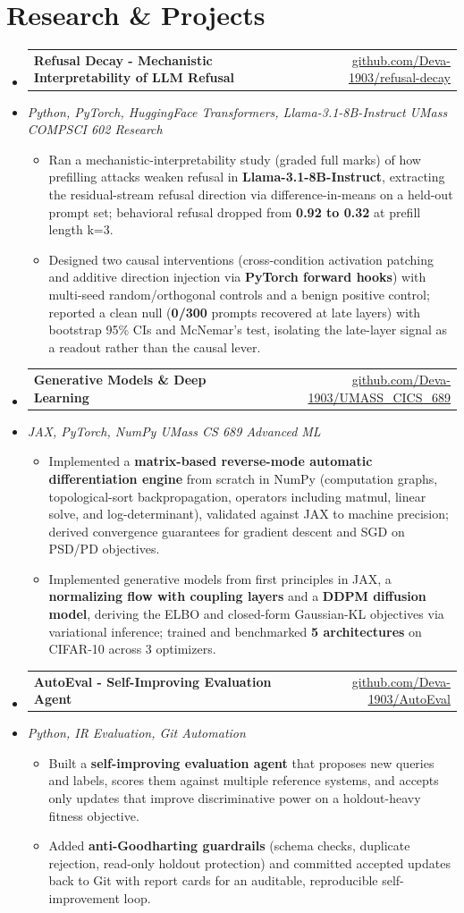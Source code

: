 \documentclass[letterpaper,10pt]{article}
\makeatletter
\newcommand{\resumeItem}[1]{
  \item\small{#1\vspace{-1pt}}
}
\newcommand{\resumeProjectHeading}[2]{
    \item
    \begin{tabular*}{0.985\textwidth}[t]{l@{\extracolsep{\fill}}r}
      \small\textbf{#1} & \small #2 \\
    \end{tabular*}\vspace{-5pt}
}
\newcommand{\resumeProjectSubheading}[1]{
  \vspace{-2pt}\item[] {\small\textcolor{ResumeSlate}{\emph{#1}}}\vspace{-3pt}
}
\newcommand{\resumeSubHeadingListStart}{\begin{itemize}[leftmargin=0.0in, label={}, itemsep=2pt, topsep=2pt]}
\newcommand{\resumeSubHeadingListEnd}{\end{itemize}}
\newcommand{\resumeItemListStart}{\begin{itemize}[leftmargin=0.18in, itemsep=2pt, topsep=1pt]}
\newcommand{\resumeItemListEnd}{\end{itemize}\vspace{-4pt}}
\makeatother
\begin{document}
\section{Research \& Projects}
\resumeSubHeadingListStart
  \resumeProjectHeading
    {Refusal Decay - Mechanistic Interpretability of LLM Refusal}
    {\href{https://github.com/Deva-1903/refusal-decay}{github.com/Deva-1903/refusal-decay}}
  \resumeProjectSubheading{Python, PyTorch, HuggingFace Transformers, Llama-3.1-8B-Instruct \enspace\textbar\enspace UMass COMPSCI 602 Research}
    \resumeItemListStart
      \resumeItem{Ran a mechanistic-interpretability study (graded full marks) of how prefilling attacks weaken refusal in \textbf{Llama-3.1-8B-Instruct}, extracting the residual-stream refusal direction via difference-in-means on a held-out prompt set; behavioral refusal dropped from \textbf{0.92 to 0.32} at prefill length k=3.}
      \resumeItem{Designed two causal interventions (cross-condition activation patching and additive direction injection via \textbf{PyTorch forward hooks}) with multi-seed random/orthogonal controls and a benign positive control; reported a clean null (\textbf{0/300} prompts recovered at late layers) with bootstrap 95\% CIs and McNemar's test, isolating the late-layer signal as a readout rather than the causal lever.}
    \resumeItemListEnd
  \resumeProjectHeading
    {Generative Models \& Deep Learning}
    {\href{https://github.com/Deva-1903/UMASS_CICS_689}{github.com/Deva-1903/UMASS\_CICS\_689}}
  \resumeProjectSubheading{JAX, PyTorch, NumPy \enspace\textbar\enspace UMass CS 689 Advanced ML}
    \resumeItemListStart
      \resumeItem{Implemented a \textbf{matrix-based reverse-mode automatic differentiation engine} from scratch in NumPy (computation graphs, topological-sort backpropagation, operators including matmul, linear solve, and log-determinant), validated against JAX to machine precision; derived convergence guarantees for gradient descent and SGD on PSD/PD objectives.}
      \resumeItem{Implemented generative models from first principles in JAX, a \textbf{normalizing flow with coupling layers} and a \textbf{DDPM diffusion model}, deriving the ELBO and closed-form Gaussian-KL objectives via variational inference; trained and benchmarked \textbf{5 architectures} on CIFAR-10 across 3 optimizers.}
    \resumeItemListEnd
  \resumeProjectHeading
    {AutoEval - Self-Improving Evaluation Agent}
    {\href{https://github.com/Deva-1903/AutoEval}{github.com/Deva-1903/AutoEval}}
  \resumeProjectSubheading{Python, IR Evaluation, Git Automation}
    \resumeItemListStart
      \resumeItem{Built a \textbf{self-improving evaluation agent} that proposes new queries and labels, scores them against multiple reference systems, and accepts only updates that improve discriminative power on a holdout-heavy fitness objective.}
      \resumeItem{Added \textbf{anti-Goodharting guardrails} (schema checks, duplicate rejection, read-only holdout protection) and committed accepted updates back to Git with report cards for an auditable, reproducible self-improvement loop.}
    \resumeItemListEnd
\resumeSubHeadingListEnd
\vspace{-4pt}
\end{document}
